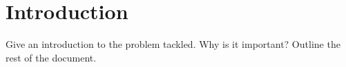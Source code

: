 \section{Introduction} \label{sec:intro}

Give an introduction to the problem tackled. Why is it important? Outline the rest of the document.
